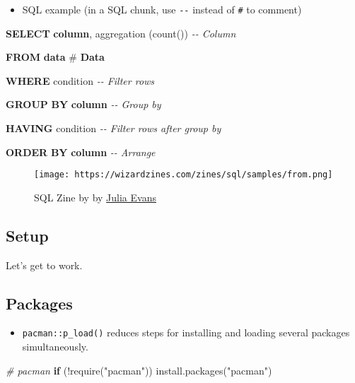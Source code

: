 \documentclass[
]{book}
\newenvironment{Shaded}{\begin{snugshade}}{\end{snugshade}}
\newcommand{\CommentTok}[1]{\textcolor[rgb]{0.56,0.35,0.01}{\textit{#1}}}
\newcommand{\ControlFlowTok}[1]{\textcolor[rgb]{0.13,0.29,0.53}{\textbf{#1}}}
\newcommand{\FunctionTok}[1]{\textcolor[rgb]{0.00,0.00,0.00}{#1}}
\newcommand{\KeywordTok}[1]{\textcolor[rgb]{0.13,0.29,0.53}{\textbf{#1}}}
\newcommand{\NormalTok}[1]{#1}
\newcommand{\SpecialCharTok}[1]{\textcolor[rgb]{0.00,0.00,0.00}{#1}}
\newcommand{\StringTok}[1]{\textcolor[rgb]{0.31,0.60,0.02}{#1}}
\providecommand{\tightlist}{%
  \setlength{\itemsep}{0pt}\setlength{\parskip}{0pt}}
\begin{document}
\begin{itemize}
\tightlist
\item
  SQL example (in a SQL chunk, use \texttt{-\/-} instead of \texttt{\#} to comment)
\end{itemize}

\begin{Shaded}
\begin{Highlighting}[]

\KeywordTok{SELECT} \KeywordTok{column}\NormalTok{, aggregation (}\FunctionTok{count}\NormalTok{())\textasciigrave{} }\CommentTok{{-}{-} Column}

\KeywordTok{FROM} \KeywordTok{data}\NormalTok{ \# }\KeywordTok{Data} 

\KeywordTok{WHERE}\NormalTok{ condition }\CommentTok{{-}{-} Filter rows }

\KeywordTok{GROUP} \KeywordTok{BY} \KeywordTok{column} \CommentTok{{-}{-} Group by}

\KeywordTok{HAVING}\NormalTok{ condition }\CommentTok{{-}{-} Filter rows after group by  }

\KeywordTok{ORDER} \KeywordTok{BY} \KeywordTok{column} \CommentTok{{-}{-} Arrange }
\end{Highlighting}
\end{Shaded}

\begin{figure}
\centering
\texttt{[image: https://wizardzines.com/zines/sql/samples/from.png]}
\caption{SQL Zine by by \href{https://jvns.ca/}{Julia Evans}}
\end{figure}

\hypertarget{setup-10}{%
\subsection{Setup}\label{setup-10}}

Let's get to work.

\hypertarget{packages-1}{%
\subsection{Packages}\label{packages-1}}

\begin{itemize}
\tightlist
\item
  \texttt{pacman::p\_load()} reduces steps for installing and loading several packages simultaneously.
\end{itemize}

\begin{Shaded}
\begin{Highlighting}[]
\CommentTok{\# pacman }
\ControlFlowTok{if}\NormalTok{ (}\SpecialCharTok{!}\FunctionTok{require}\NormalTok{(}\StringTok{"pacman"}\NormalTok{)) }\FunctionTok{install.packages}\NormalTok{(}\StringTok{"pacman"}\NormalTok{)}
\end{Highlighting}
\end{Shaded}
\end{document}
